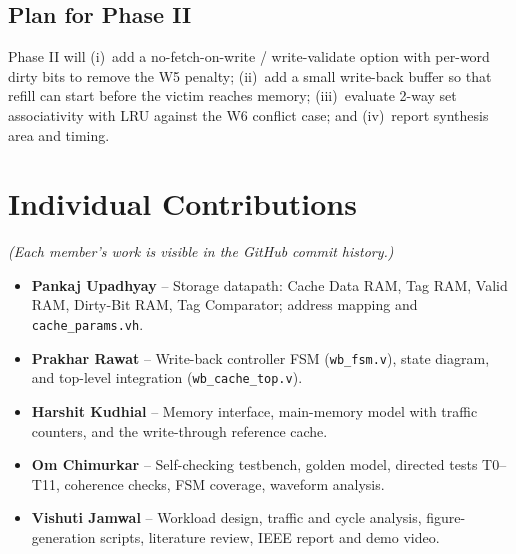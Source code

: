 \documentclass[conference]{IEEEtran}
\begin{document}
\subsection{Plan for Phase II}
Phase II will (i)~add a no-fetch-on-write / write-validate option with
per-word dirty bits to remove the W5 penalty; (ii)~add a small write-back
buffer so that refill can start before the victim reaches memory; (iii)~evaluate
2-way set associativity with LRU against the W6 conflict case; and (iv)~report
synthesis area and timing.

\section{Individual Contributions}
\noindent\textit{(Each member's work is visible in the GitHub commit history.)}
\begin{itemize}
\item \textbf{Pankaj Upadhyay} -- Storage datapath: Cache Data RAM, Tag RAM,
Valid RAM, Dirty-Bit RAM, Tag Comparator; address mapping and
\texttt{cache\_params.vh}.
\item \textbf{Prakhar Rawat} -- Write-back controller FSM (\texttt{wb\_fsm.v}),
state diagram, and top-level integration (\texttt{wb\_cache\_top.v}).
\item \textbf{Harshit Kudhial} -- Memory interface, main-memory model with traffic
counters, and the write-through reference cache.
\item \textbf{Om Chimurkar} -- Self-checking testbench, golden model, directed
tests T0--T11, coherence checks, FSM coverage, waveform analysis.
\item \textbf{Vishuti Jamwal} -- Workload design, traffic and cycle analysis,
figure-generation scripts, literature review, IEEE report and demo video.
\end{itemize}
\end{document}
